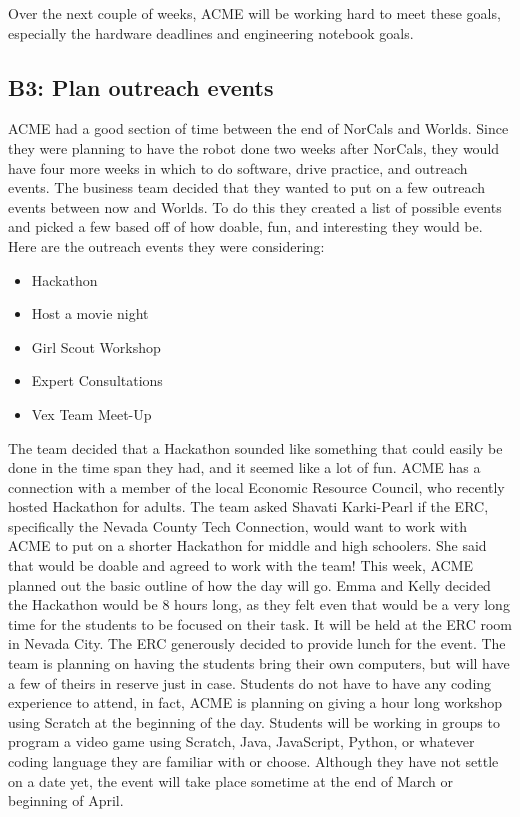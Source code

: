 \documentclass{article}
\begin{document}
Over the next couple of weeks, ACME will be working hard to meet these goals, especially the hardware deadlines and engineering notebook goals. \\

\subsection{B3: Plan outreach events}

ACME had a good section of time between the end of NorCals and Worlds. Since they were planning to have the robot done two weeks after NorCals, they would have four more weeks in which to do software, drive practice, and outreach events. The business team decided that they wanted to put on a few outreach events between now and Worlds. To do this they created a list of possible events and picked a few based off of how doable, fun, and interesting they would be. Here are the outreach events they were considering:

\begin{itemize}
    \item Hackathon
    \item Host a movie night
    \item Girl Scout Workshop
    \item Expert Consultations
    \item Vex Team Meet-Up
\end{itemize}

The team decided that a Hackathon sounded like something that could easily be done in the time span they had, and it seemed like a lot of fun. ACME has a connection with a member of the local Economic Resource Council, who recently hosted Hackathon for adults. The team asked Shavati Karki-Pearl if the ERC, specifically the Nevada County Tech Connection, would want to work with ACME to put on a shorter Hackathon for middle and high schoolers. She said that would be doable and agreed to work with the team! This week, ACME planned out the basic outline of how the day will go. Emma and Kelly decided the Hackathon would be 8 hours long, as they felt even that would be a very long time for the students to be focused on their task. It will be held at the ERC room in Nevada City. The ERC generously decided to provide lunch for the event. The team is planning on having the students bring their own computers, but will have a few of theirs in reserve just in case. Students do not have to have any coding experience to attend, in fact, ACME is planning on giving a hour long workshop using Scratch at the beginning of the day. Students will be working in groups to program a video game using Scratch, Java, JavaScript, Python, or whatever coding language they are familiar with or choose. Although they have not settle on a date yet, the event will take place sometime at the end of March or beginning of April. \\
\end{document}
